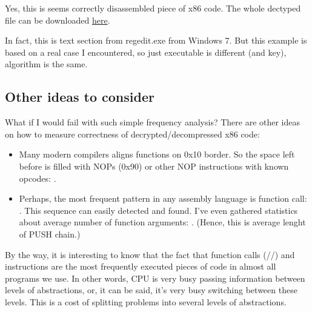 Yes, this is seems correctly disassembled piece of x86 code.
The whole dectyped file can be downloaded \href{https://github.com/dennis714/yurichev.com/blob/master/blog/breaking_simple_exec_crypto/files/decrypted.bin}{here}.

In fact, this is text section from regedit.exe from Windows 7.
But this example is based on a real case I encountered, so just executable is different (and key), algorithm is the same.

\subsection{Other ideas to consider}

What if I would fail with such simple frequency analysis?
There are other ideas on how to measure correctness of decrypted/decompressed x86 code:

\begin{itemize}

\item Many modern compilers aligns functions on 0x10 border.
So the space left before is filled with NOPs (0x90) or other NOP instructions with known opcodes: .

\item Perhaps, the most frequent pattern in any assembly language is function call:\\
.
This sequence can easily detected and found.
I've even gathered statistics about average number of function arguments: .
(Hence, this is average lenght of PUSH chain.)

\end{itemize}

By the way, 
it is interesting to know that the fact that function calls (\PUSH/\CALL/\ADD) and \MOV instructions are the most frequently executed pieces of code in almost all
programs we use.
In other words, CPU is very busy passing information between levels of abstractions, or, it can be said, it's very busy switching between these levels.
This is a cost of splitting problems into several levels of abstractions.

